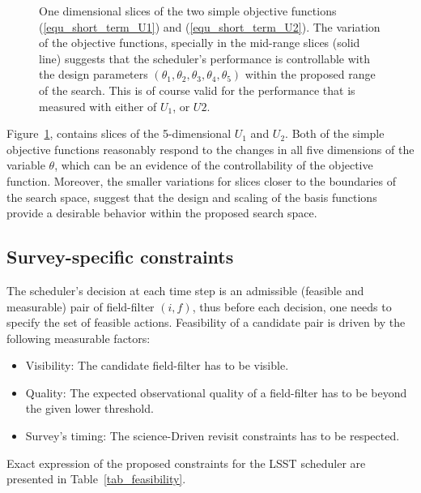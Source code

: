 \documentclass[12pt]{aastex62}
\theoremstyle{definition}
\begin{document}
\begin{figure}[h]
\caption{One dimensional slices of the two simple objective functions (\ref{equ_short_term_U1}) and (\ref{equ_short_term_U2}). The variation of the objective functions, specially in the mid-range slices (solid line) suggests that the scheduler's performance is controllable with the design parameters $(\theta_1,\theta_2,\theta_3,\theta_4,\theta_5)$ within the proposed range of the search. This is of course valid for the performance that is measured with either of $U_1$, or $U2$.}
\label{fig_controlability}
\end{figure}

Figure~\ref{fig_controlability}, contains slices of the 5-dimensional $U_1$ and $U_2$. Both of the simple objective functions reasonably respond to the changes in all five dimensions of the variable $\theta$, which can be an evidence of the controllability of the objective function. Moreover, the smaller variations for slices closer to the boundaries of the search space, suggest that the design and scaling of the basis functions provide a desirable behavior within the proposed search space.

\subsection{Survey-specific constraints}\label{sec_cstr}

The scheduler's decision at each time step is an admissible (feasible and measurable) pair of field-filter $(i,f)$, thus before each decision, one needs to specify the set of feasible actions. Feasibility of a candidate pair is driven by the following measurable factors:

\begin{itemize}
\item Visibility: The candidate field-filter has to be visible.
\item Quality: The expected observational quality of a field-filter has to be beyond the given lower threshold.
\item Survey's timing: The science-Driven revisit constraints has to be respected.
\end{itemize}

Exact expression of the proposed constraints for the LSST scheduler are presented in Table~\ref{tab_feasibility}.
\end{document}
